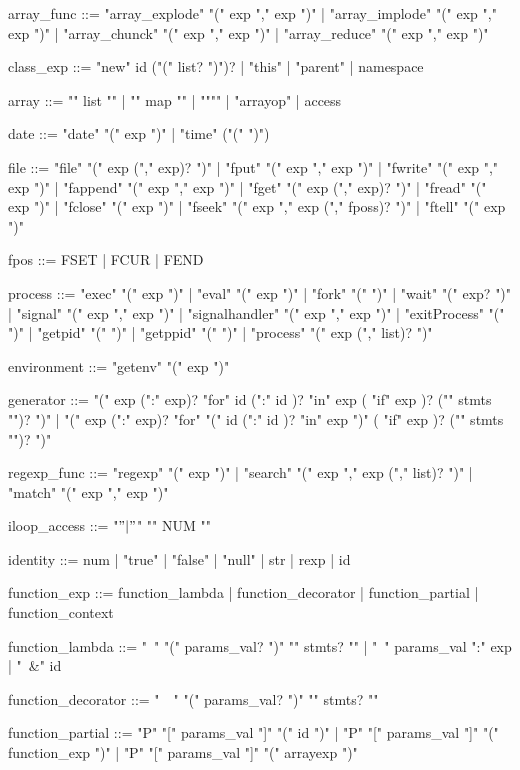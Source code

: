 array_func ::= "array_explode" "(" exp "," exp ")"
   |  "array_implode" "(" exp "," exp ")"
   |  "array_chunck" "(" exp "," exp ")"
   |  "array_reduce" "(" exp "," exp ")"
   
class_exp ::= "new" id ("(" list? ")")?
   |  "this" 
   |  "parent"
   |  namespace
   
array ::= "{" list "}"
   |  "{" map "}"
   |  "{""}"
   |  "arrayop"
   |  access

date ::= "date" "(" exp ")"
   |  "time" ("(" ")")

file ::= "file" "(" exp ("," exp)? ")"
   |  "fput" "(" exp "," exp ")"
   |  "fwrite" "(" exp "," exp ")"
   |  "fappend" "(" exp "," exp ")"
   |  "fget" "(" exp ("," exp)? ")"
   |  "fread" "(" exp ")"
   |  "fclose" "(" exp ")"
   |  "fseek" "(" exp "," exp ("," fposs)? ")"
   |  "ftell" "(" exp ")"

fpos ::= FSET
   |  FCUR
   | FEND
   
process ::= "exec" "(" exp ")"
   |  "eval" "(" exp ")"
   |  "fork" "(" ")"
   |  "wait" "(" exp? ")"
   |  "signal" "(" exp "," exp ")"
   |  "signalhandler" "(" exp "," exp ")"
   |  "exitProcess" "(" ")"
   |  "getpid" "(" ")"
   |  "getppid" "(" ")"
   |  "process" "(" exp ("," list)? ")"
   
environment ::= "getenv" "(" exp ")"

generator ::= "(" exp (":" exp)? "for" id (":" id )? "in" exp ( "if" exp )? ("{" stmts "}")? ")"
   | "(" exp (":" exp)? "for" "(" id (":" id )? "in" exp ")" ( "if" exp )? ("{" stmts "}")? ")"

regexp_func ::= "regexp" "(" exp ")"
   |  "search" "(" exp "," exp ("," list)? ")"
   |  "match" "(" exp "," exp ")"
   
iloop_access ::= "$"
   |  "$" "{" NUM "}"

identity ::=  num
   |  "true"
   |  "false"
   |  "null"
   |  str
   |  rexp
   |  id 
   
function_exp ::= function_lambda
   |  function_decorator 
   |  function_partial
   |  function_context
   
function_lambda ::= "~" "(" params_val? ")" "{" stmts? "}"
    | "~" params_val ":" exp
    | "~&" id

function_decorator ::= "~~" "(" params_val? ")" "{" stmts? "}"

function_partial ::= "P" "[" params_val "]" "(" id ")"
   |  "P" "[" params_val "]" "(" function_exp ")"
   |  "P" "[" params_val "]" "(" arrayexp ")"
   
